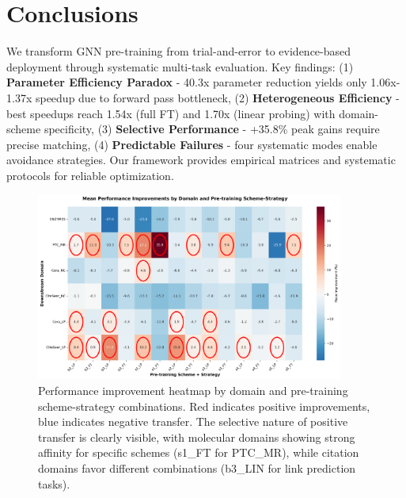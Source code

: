 \documentclass[11pt]{article}
\begin{document}
\section{Conclusions}

We transform GNN pre-training from trial-and-error to evidence-based deployment through systematic multi-task evaluation. Key findings: (1) \textbf{Parameter Efficiency Paradox} - 40.3x parameter reduction yields only 1.06x-1.37x speedup due to forward pass bottleneck, (2) \textbf{Heterogeneous Efficiency} - best speedups reach 1.54x (full FT) and 1.70x (linear probing) with domain-scheme specificity, (3) \textbf{Selective Performance} - +35.8\% peak gains require precise matching, (4) \textbf{Predictable Failures} - four systematic modes enable avoidance strategies. Our framework provides empirical matrices and systematic protocols for reliable optimization.



\begin{figure}[!h]
\centering
\includegraphics[width=0.9\textwidth]{domain_performance_heatmap.png}
\caption{Performance improvement heatmap by domain and pre-training scheme-strategy combinations. Red indicates positive improvements, blue indicates negative transfer. The selective nature of positive transfer is clearly visible, with molecular domains showing strong affinity for specific schemes (s1\_FT for PTC\_MR), while citation domains favor different combinations (b3\_LIN for link prediction tasks).}
\label{fig:domain-heatmap}
\end{figure}
\end{document}
